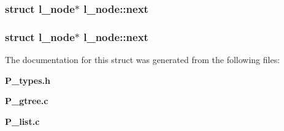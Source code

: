 \subsubsection{\setlength{\rightskip}{0pt plus 5cm}struct l\_\-node$\ast$ l\_\-node::next}\label{structl__node_m3}


\subsubsection{\setlength{\rightskip}{0pt plus 5cm}struct l\_\-node$\ast$ l\_\-node::next}\label{structl__node_m1}




The documentation for this struct was generated from the following files:\begin{CompactItemize}
\item 
{\bf P\_\-types.h}\item 
{\bf P\_\-gtree.c}\item 
{\bf P\_\-list.c}\end{CompactItemize}
